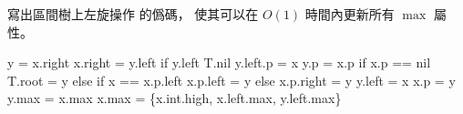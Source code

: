 \startEXERCISE
寫出區間樹上左旋操作  的僞碼，
使其可以在 $O(1)$ 時間內更新所有 $\max$ 屬性。
\stopEXERCISE

\startANSWER
{}
\startCLRSCODE
y = x.right
x.right = y.left
if y.left \ne T.nil
	y.left.p = x
y.p = x.p
if x.p == nil
	T.root = y
else if x == x.p.left
	x.p.left = y
else
	x.p.right = y
y.left = x
x.p = y
y.max = x.max
x.max = \max\{x.int.high, x.left.max, y.left.max\}
\stopCLRSCODE
\stopANSWER
